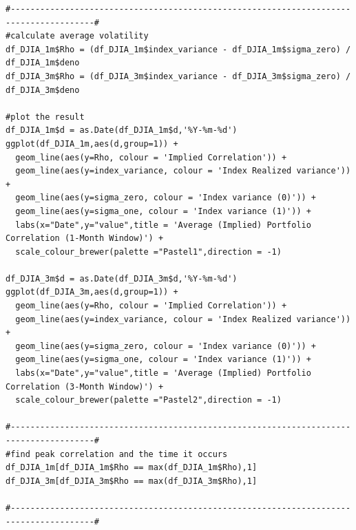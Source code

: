\documentclass[10pt]{article}
\begin{document}
\begin{lstlisting}
#---------------------------------------------------------------------------------------#
#calculate average volatility
df_DJIA_1m$Rho = (df_DJIA_1m$index_variance - df_DJIA_1m$sigma_zero) / df_DJIA_1m$deno 
df_DJIA_3m$Rho = (df_DJIA_3m$index_variance - df_DJIA_3m$sigma_zero) / df_DJIA_3m$deno

#plot the result
df_DJIA_1m$d = as.Date(df_DJIA_1m$d,'%Y-%m-%d')
ggplot(df_DJIA_1m,aes(d,group=1)) +
  geom_line(aes(y=Rho, colour = 'Implied Correlation')) +
  geom_line(aes(y=index_variance, colour = 'Index Realized variance')) +
  geom_line(aes(y=sigma_zero, colour = 'Index variance (0)')) +
  geom_line(aes(y=sigma_one, colour = 'Index variance (1)')) +
  labs(x="Date",y="value",title = 'Average (Implied) Portfolio Correlation (1-Month Window)') +
  scale_colour_brewer(palette ="Pastel1",direction = -1)

df_DJIA_3m$d = as.Date(df_DJIA_3m$d,'%Y-%m-%d')
ggplot(df_DJIA_3m,aes(d,group=1)) +
  geom_line(aes(y=Rho, colour = 'Implied Correlation')) +
  geom_line(aes(y=index_variance, colour = 'Index Realized variance')) +
  geom_line(aes(y=sigma_zero, colour = 'Index variance (0)')) +
  geom_line(aes(y=sigma_one, colour = 'Index variance (1)')) +
  labs(x="Date",y="value",title = 'Average (Implied) Portfolio Correlation (3-Month Window)') +
  scale_colour_brewer(palette ="Pastel2",direction = -1)

#---------------------------------------------------------------------------------------#
#find peak correlation and the time it occurs
df_DJIA_1m[df_DJIA_1m$Rho == max(df_DJIA_1m$Rho),1]
df_DJIA_3m[df_DJIA_3m$Rho == max(df_DJIA_3m$Rho),1]

#---------------------------------------------------------------------------------------#

\end{lstlisting}
\end{document}
